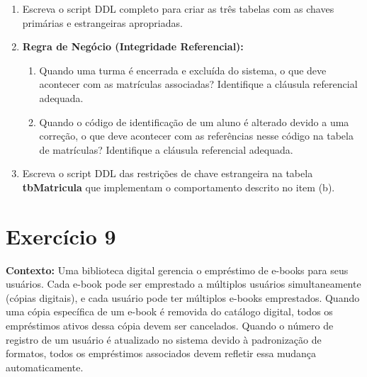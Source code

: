 \begin{enumerate}[label=\textbf{\alph*)}]
    \item Escreva o script DDL completo para criar as três tabelas com as chaves primárias e estrangeiras apropriadas.
    \resposta{4cm}
    
    \item \textbf{Regra de Negócio (Integridade Referencial):} 
    \begin{enumerate}[label=\arabic*.]
        \item Quando uma turma é encerrada e excluída do sistema, o que deve acontecer com as matrículas associadas? Identifique a cláusula referencial adequada.
        \item Quando o código de identificação de um aluno é alterado devido a uma correção, o que deve acontecer com as referências nesse código na tabela de matrículas? Identifique a cláusula referencial adequada.
    \end{enumerate}
    \resposta{3cm}
    
    \item Escreva o script DDL das restrições de chave estrangeira na tabela \textbf{tbMatricula} que implementam o comportamento descrito no item (b).
    \resposta{3cm}
\end{enumerate}

\section*{Exercício 9}

\textbf{Contexto:} Uma biblioteca digital gerencia o empréstimo de e-books para seus usuários. Cada e-book pode ser emprestado a múltiplos usuários simultaneamente (cópias digitais), e cada usuário pode ter múltiplos e-books emprestados. Quando uma cópia específica de um e-book é removida do catálogo digital, todos os empréstimos ativos dessa cópia devem ser cancelados. Quando o número de registro de um usuário é atualizado no sistema devido à padronização de formatos, todos os empréstimos associados devem refletir essa mudança automaticamente.

